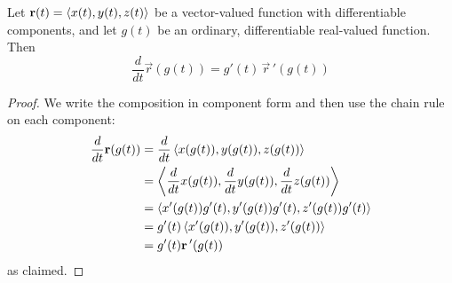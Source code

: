 \documentclass[handout]{ximera}
\begin{document}
\begin{proposition}
Let $\mathbf r(t) = \left\langle x(t), y(t),z(t)\right\rangle$ be a vector-valued function with differentiable components, and let $g(t)$ be an ordinary, differentiable real-valued function.
Then
\[
\frac{d}{dt}\vec r(g(t)) = g'(t)\,\vec r\,'(g(t))
\]
\end{proposition}
\begin{proof}
We write the composition in component form and then use the chain rule on each component:
\begin{align*}
\frac{d}{dt} \mathbf r(g(t)) &= \frac{d}{dt} \left\langle x(g(t)), y(g(t)),z(g(t))\right\rangle\\
&= \left\langle \frac{d}{dt} x(g(t)), \frac{d}{dt} y(g(t)), \frac{d}{dt} z(g(t))\right\rangle\\
&= \left\langle x'(g(t)) g'(t), y'(g(t)) g'(t), z'(g(t)) g'(t)\right\rangle\\
&= g'(t)\left\langle x'(g(t)), y'(g(t)), z'(g(t))\right\rangle\\
&= g'(t) \mathbf r\,'(g(t))
\end{align*}
as claimed.
\end{proof}
\end{document}
